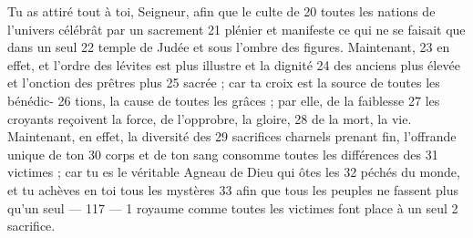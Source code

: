 Tu as attiré tout à toi, Seigneur, afin que le culte de	 
20	 	toutes les nations de l'univers célébrât par un sacrement	 
21	 	plénier et manifeste ce qui ne se faisait que dans un seul	 
22	 	temple de Judée et sous l'ombre des figures. Maintenant,	 
23	 	en effet, et l'ordre des lévites est plus illustre et la dignité	 
24	 	des anciens plus élevée et l'onction des prêtres plus	 
25	 	sacrée ; car ta croix est la source de toutes les bénédic-	 
26	 	tions, la cause de toutes les grâces ; par elle, de la faiblesse	 
27	 	les croyants reçoivent la force, de l'opprobre, la gloire,	 
28	 	de la mort, la vie. Maintenant, en effet, la diversité des	 
29	 	sacrifices charnels prenant fin, l'offrande unique de ton	 
30	 	corps et de ton sang consomme toutes les différences des	 
31	 	victimes ; car tu es le véritable Agneau de Dieu qui ôtes les	 
32	 	péchés du monde, et tu achèves en toi tous les mystères	 
33	 	afin que tous les peuples ne fassent plus qu'un seul	 
 	--- 117 ---	 
1	 	royaume comme toutes les victimes font place à un seul	 
2	 	sacrifice.